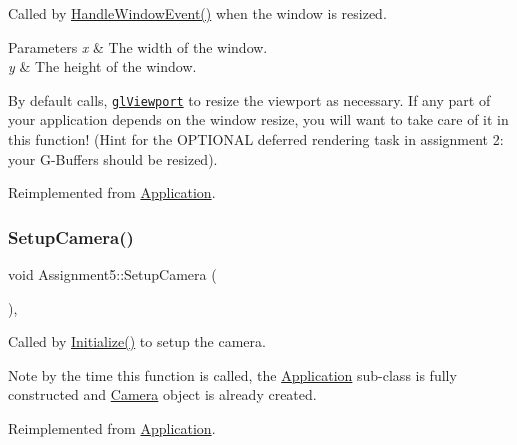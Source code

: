 Called by \hyperlink{class_application_a74d92db64e051efa56d0357989dcb755}{Handle\+Window\+Event()} when the window is resized. 


\begin{DoxyParams}{Parameters}
{\em x} & The width of the window. \\
\hline
{\em y} & The height of the window.\\
\hline
\end{DoxyParams}
By default calls, \href{https://www.opengl.org/sdk/docs/man/html/glViewport.xhtml}{\tt gl\+Viewport} to resize the viewport as necessary. If any part of your application depends on the window resize, you will want to take care of it in this function! (Hint for the O\+P\+T\+I\+O\+N\+AL deferred rendering task in assignment 2\+: your \textquotesingle{}G-\/\+Buffers\textquotesingle{} should be resized). 

Reimplemented from \hyperlink{class_application_abdba284a0f075ee1d4a2108c3a5236a2}{Application}.

\hypertarget{class_assignment5_a0c49123e133adfb36c769c943eae42fa}{}\label{class_assignment5_a0c49123e133adfb36c769c943eae42fa} 
\subsubsection{\texorpdfstring{Setup\+Camera()}{SetupCamera()}}
{\footnotesize\ttfamily void Assignment5\+::\+Setup\+Camera (\begin{DoxyParamCaption}{ }\end{DoxyParamCaption})\hspace{0.3cm}{\ttfamily [private]}, {\ttfamily [virtual]}}



Called by \hyperlink{class_application_a17cf1ea4552d26a1c20f7d98d793d41d}{Initialize()} to setup the camera. 

Note by the time this function is called, the \hyperlink{class_application}{Application} sub-\/class is fully constructed and \hyperlink{class_camera}{Camera} object is already created. 

Reimplemented from \hyperlink{class_application_a2eb61ca027f223a5c5ad1bf982481193}{Application}.

\hypertarget{class_assignment5_ad2a3f3271ee7aa69dec95ccf7a95f224}{}\label{class_assignment5_ad2a3f3271ee7aa69dec95ccf7a95f224} 
